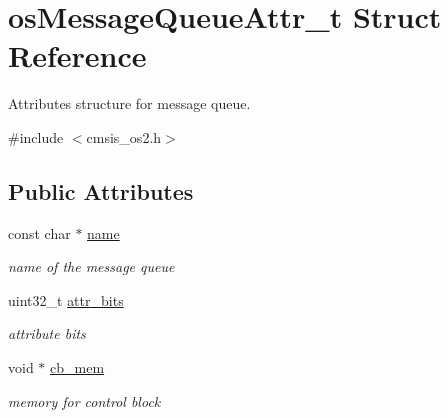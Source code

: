 \hypertarget{structos_message_queue_attr__t}{}\section{os\+Message\+Queue\+Attr\+\_\+t Struct Reference}
\label{structos_message_queue_attr__t}


Attributes structure for message queue.  




{\ttfamily \#include $<$cmsis\+\_\+os2.\+h$>$}

\subsection*{Public Attributes}
\begin{DoxyCompactItemize}
\item 
\mbox{\label{structos_message_queue_attr__t_a7a0ddc31f97f8d8e5d9f880f5d03768b}} 
const char $\ast$ \mbox{\hyperlink{structos_message_queue_attr__t_a7a0ddc31f97f8d8e5d9f880f5d03768b}{name}}
\begin{DoxyCompactList}\small\item\em name of the message queue \end{DoxyCompactList}\item 
\mbox{\label{structos_message_queue_attr__t_a89d1d6bc8c5926f764c0c915f7fc04e5}} 
uint32\+\_\+t \mbox{\hyperlink{structos_message_queue_attr__t_a89d1d6bc8c5926f764c0c915f7fc04e5}{attr\+\_\+bits}}
\begin{DoxyCompactList}\small\item\em attribute bits \end{DoxyCompactList}\item 
\mbox{\label{structos_message_queue_attr__t_ad3452e2c35fbdccbedfc88781ad16059}} 
void $\ast$ \mbox{\hyperlink{structos_message_queue_attr__t_ad3452e2c35fbdccbedfc88781ad16059}{cb\+\_\+mem}}
\begin{DoxyCompactList}\small\item\em memory for control block \end{DoxyCompactList}\item 
\mbox{\label{structos_message_queue_attr__t_af027a158b586c5064006bba6f965b8fa}} 

\end{DoxyCompactItemize}
